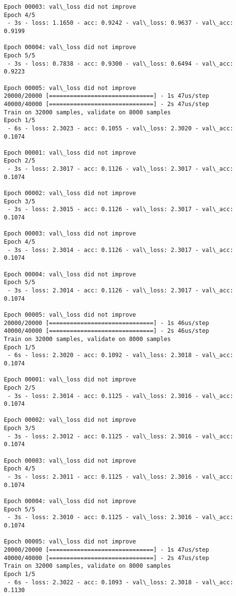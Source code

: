 \documentclass[11pt]{article}
\begin{document}
\begin{Verbatim}[commandchars=\\\{\}]
Epoch 00003: val\_loss did not improve
Epoch 4/5
 - 3s - loss: 1.1650 - acc: 0.9242 - val\_loss: 0.9637 - val\_acc: 0.9199

Epoch 00004: val\_loss did not improve
Epoch 5/5
 - 3s - loss: 0.7838 - acc: 0.9300 - val\_loss: 0.6494 - val\_acc: 0.9223

Epoch 00005: val\_loss did not improve
20000/20000 [==============================] - 1s 47us/step
40000/40000 [==============================] - 2s 47us/step
Train on 32000 samples, validate on 8000 samples
Epoch 1/5
 - 6s - loss: 2.3023 - acc: 0.1055 - val\_loss: 2.3020 - val\_acc: 0.1074

Epoch 00001: val\_loss did not improve
Epoch 2/5
 - 3s - loss: 2.3017 - acc: 0.1126 - val\_loss: 2.3017 - val\_acc: 0.1074

Epoch 00002: val\_loss did not improve
Epoch 3/5
 - 3s - loss: 2.3015 - acc: 0.1126 - val\_loss: 2.3017 - val\_acc: 0.1074

Epoch 00003: val\_loss did not improve
Epoch 4/5
 - 3s - loss: 2.3014 - acc: 0.1126 - val\_loss: 2.3017 - val\_acc: 0.1074

Epoch 00004: val\_loss did not improve
Epoch 5/5
 - 3s - loss: 2.3014 - acc: 0.1126 - val\_loss: 2.3017 - val\_acc: 0.1074

Epoch 00005: val\_loss did not improve
20000/20000 [==============================] - 1s 46us/step
40000/40000 [==============================] - 2s 46us/step
Train on 32000 samples, validate on 8000 samples
Epoch 1/5
 - 6s - loss: 2.3020 - acc: 0.1092 - val\_loss: 2.3018 - val\_acc: 0.1074

Epoch 00001: val\_loss did not improve
Epoch 2/5
 - 3s - loss: 2.3014 - acc: 0.1125 - val\_loss: 2.3016 - val\_acc: 0.1074

Epoch 00002: val\_loss did not improve
Epoch 3/5
 - 3s - loss: 2.3012 - acc: 0.1125 - val\_loss: 2.3016 - val\_acc: 0.1074

Epoch 00003: val\_loss did not improve
Epoch 4/5
 - 3s - loss: 2.3011 - acc: 0.1125 - val\_loss: 2.3016 - val\_acc: 0.1074

Epoch 00004: val\_loss did not improve
Epoch 5/5
 - 3s - loss: 2.3010 - acc: 0.1125 - val\_loss: 2.3016 - val\_acc: 0.1074

Epoch 00005: val\_loss did not improve
20000/20000 [==============================] - 1s 47us/step
40000/40000 [==============================] - 2s 47us/step
Train on 32000 samples, validate on 8000 samples
Epoch 1/5
 - 6s - loss: 2.3022 - acc: 0.1093 - val\_loss: 2.3018 - val\_acc: 0.1130


\end{Verbatim}
\end{document}
